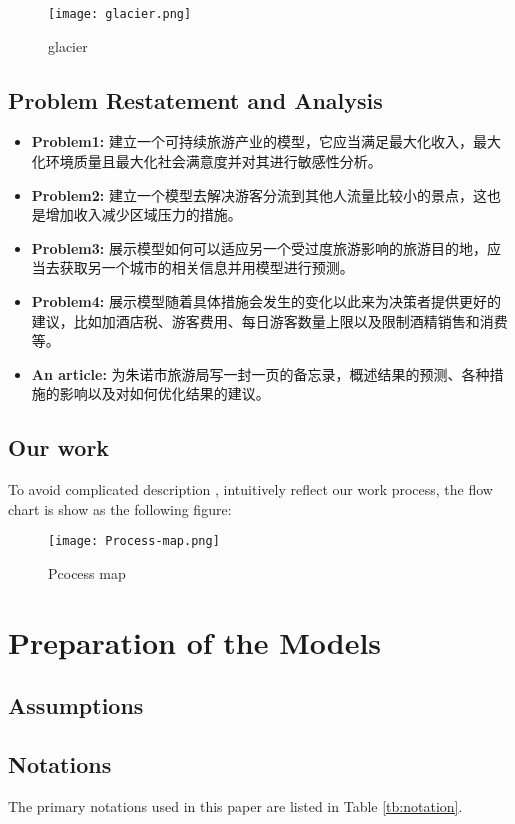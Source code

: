 \documentclass[12pt]{article}  %
\begin{document}
\begin{figure}[H]
	\centering
	\texttt{[image: glacier.png]}
	\caption{glacier}\label{fig:glacier}
\end{figure}

\subsection{Problem Restatement and Analysis}
\begin{itemize}
    \item \textbf{Problem1: }建立一个可持续旅游产业的模型，它应当满足最大化收入，最大化环境质量且最大化社会满意度并对其进行敏感性分析。
    \item \textbf{Problem2: }建立一个模型去解决游客分流到其他人流量比较小的景点，这也是增加收入减少区域压力的措施。
    \item \textbf{Problem3: }展示模型如何可以适应另一个受过度旅游影响的旅游目的地，应当去获取另一个城市的相关信息并用模型进行预测。
    \item \textbf{Problem4: }展示模型随着具体措施会发生的变化以此来为决策者提供更好的建议，比如加酒店税、游客费用、每日游客数量上限以及限制酒精销售和消费等。
    \item \textbf{An article: }为朱诺市旅游局写一封一页的备忘录，概述结果的预测、各种措施的影响以及对如何优化结果的建议。
\end{itemize}

\subsection{Our work}
To avoid complicated description , intuitively reflect our work process, the flow chart is show
as the following figure:
\begin{figure}[H]
	\centering
	\texttt{[image: Process-map.png]}
	\caption{Pcocess map}\label{fig:Process-map}
\end{figure}

\section{Preparation of the Models}
\subsection{Assumptions}

\subsection{Notations}
The primary notations used in this paper are listed in Table \ref{tb:notation}.
\end{document}
